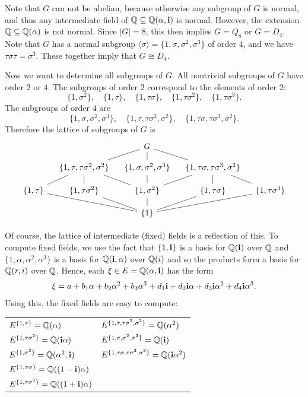 \begin{example}
Note that $G$ can not be abelian, because otherwise any subgroup of $G$ is normal, and thus any intermediate field of $\mathbb{Q}\subseteq\mathbb{Q}(\alpha,\mathbf{i})$ is normal. However, the extension $\mathbb{Q}\subseteq\mathbb{Q}(\alpha)$ is not normal. Since $|G|=8$, this then implies $G=Q_8$ or $G=D_4$. Note that $G$ has a normal subgroup $\langle\sigma\rangle=\{1,\sigma,\sigma^2,\sigma^3\}$ of order $4$, and we have $\tau\sigma\tau=\sigma^3$. These together imply that $G\cong D_4$.\par
Now we want to determine all subgroups of $G$. All nontrivial subgroups of $G$ have order $2$ or $4$. The subgroups of order $2$ correspond to the elements of order $2$:
\[\{1,\sigma^2\},\quad\{1,\tau\},\quad\{1,\tau\sigma\},\quad\{
1,\tau\sigma^2\},\quad\{1,\tau\sigma^3\}.\]
The subgroups of order $4$ are
\[\{1,\sigma,\sigma^2,\sigma^3\},\quad\{1,\tau,\tau\sigma^2,\sigma^2\},\quad\{1,\tau\sigma,\tau\sigma^3,\sigma^2\}.\]
Therefore the lattice of subgroups of $G$ is
\[\begin{tikzcd}[row sep=10pt,column sep=10pt]
&&G\ar[d,no head]\ar[rd,no head]\ar[ld,no head]&&\\
&\{1,\tau,\tau\sigma^2,\sigma^2\}\ar[d,no head]\ar[rd,no head]\ar[ld,no head]&\{1,\sigma,\sigma^2,\sigma^3\}\ar[d,no head]&\{1,\tau\sigma,\tau\sigma^3,\sigma^2\}\ar[d,no head]\ar[rd,no head]\ar[ld,no head]&\\
\{1,\tau\}&\{1,\tau\sigma^2\}&\{1,\sigma^2\}&\{1,\tau\sigma\}&\{1,\tau\sigma^3\}\\
&&\{1\}\ar[u,no head]\ar[ru,no head]\ar[rru,no head]\ar[lu,no head]\ar[llu,no head]&&
\end{tikzcd}\]

Of course, the lattice of intermediate (fixed) fields is a reflection of this. To compute fixed fields, we use the fact that $\{1,\mathbf{i}\}$ is a basis for $\mathbb{Q}(\mathbf{i})$ over $\mathbb{Q}$ and $\{1,\alpha,\alpha^2,\alpha^3\}$ is a basis for $\mathbb{Q}(\mathbf{i},\alpha)$ over $\mathbb{Q}(i)$ and so the products form a basis for $\mathbb{Q}(r,i)$ over $\mathbb{Q}$. Hence, each $\xi\in E=\mathbb{Q}(\alpha,\mathbf{i})$ has the form
\[\xi=a+b_1\alpha+b_2\alpha^2+b_3\alpha^3+d_1\mathbf{i}+d_2\mathbf{i}\alpha+d_3\mathbf{i}\alpha^2+d_4\mathbf{i}\alpha^3.\]
Using this, the fixed fields are easy to compute:
\begin{table}[htbp]
\renewcommand\arraystretch{1.25}
\centering
\begin{tabular}{l|l}
\hline
$E^{\{1,\tau\}}=\mathbb{Q}(\alpha)$&$E^{\{1,\tau,\tau\sigma^2,\sigma^2\}}=\mathbb{Q}(\alpha^2)$\\
$E^{\{1,\tau\sigma^2\}}=\mathbb{Q}(\mathbf{i}\alpha)$&$E^{\{1,\sigma,\sigma^2,\sigma^3\}}=\mathbb{Q}(\mathbf{i})$\\
$E^{\{1,\sigma^2\}}=\mathbb{Q}(\alpha^2,\mathbf{i})$&$E^{\{1,\tau\sigma,\tau\sigma^3,\sigma^2\}}=\mathbb{Q}(\mathbf{i}\alpha^2)$\\
$E^{\{1,\tau\sigma\}}=\mathbb{Q}((1-\mathbf{i})\alpha)$&\\
$E^{\{1,\tau\sigma^3\}}=\mathbb{Q}((1+\mathbf{i})\alpha)$&\\
\hline
\end{tabular}
\end{table}


\end{example}
